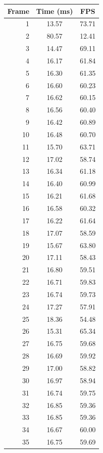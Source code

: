 \begin{table}[htbp]
  \centering\small
  \setlength{\tabcolsep}{8pt}
  \begin{tabular}{@{}rcc@{}}
    \toprule
    \textbf{Frame} & \textbf{Time (ms)} & \textbf{FPS} \\
    \midrule
    1 & 13.57 & 73.71 \\
    2 & 80.57 & 12.41 \\
    3 & 14.47 & 69.11 \\
    4 & 16.17 & 61.84 \\
    5 & 16.30 & 61.35 \\
    6 & 16.60 & 60.23 \\
    7 & 16.62 & 60.15 \\
    8 & 16.56 & 60.40 \\
    9 & 16.42 & 60.89 \\
    10 & 16.48 & 60.70 \\
    11 & 15.70 & 63.71 \\
    12 & 17.02 & 58.74 \\
    13 & 16.34 & 61.18 \\
    14 & 16.40 & 60.99 \\
    15 & 16.21 & 61.68 \\
    16 & 16.58 & 60.32 \\
    17 & 16.22 & 61.64 \\
    18 & 17.07 & 58.59 \\
    19 & 15.67 & 63.80 \\
    20 & 17.11 & 58.43 \\
    21 & 16.80 & 59.51 \\
    22 & 16.71 & 59.83 \\
    23 & 16.74 & 59.73 \\
    24 & 17.27 & 57.91 \\
    25 & 18.36 & 54.48 \\
    26 & 15.31 & 65.34 \\
    27 & 16.75 & 59.68 \\
    28 & 16.69 & 59.92 \\
    29 & 17.00 & 58.82 \\
    30 & 16.97 & 58.94 \\
    31 & 16.74 & 59.75 \\
    32 & 16.85 & 59.36 \\
    33 & 16.85 & 59.36 \\
    34 & 16.67 & 60.00 \\
    35 & 16.75 & 59.69 \\

\end{tabular}
\end{table}

